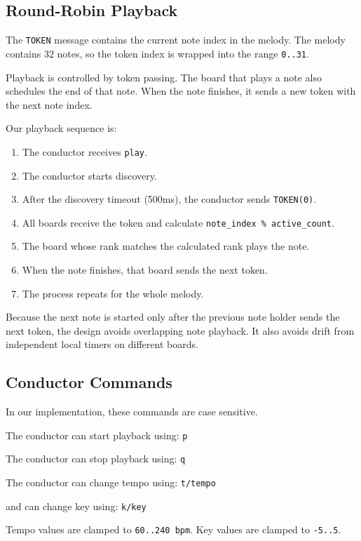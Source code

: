 \documentclass[11pt,a4paper]{article}
\begin{document}
\subsection*{Round-Robin Playback}

The \texttt{TOKEN} message contains the current note index in the melody. The melody contains 32 notes, so the token index is wrapped into the range \texttt{0..31}.

Playback is controlled by token passing. The board that plays a note also schedules the end of that note. When the note finishes, it sends a new token with the next note index.

Our playback sequence is:

\begin{enumerate}
  \item The conductor receives \texttt{play}.
  \item The conductor starts discovery.
  \item After the discovery timeout (500ms), the conductor sends \texttt{TOKEN(0)}.
  \item All boards receive the token and calculate \texttt{note\_\allowbreak{}index \% active\_\allowbreak{}count}.
  \item The board whose rank matches the calculated rank plays the note.
  \item When the note finishes, that board sends the next token.
  \item The process repeats for the whole melody.
\end{enumerate}

Because the next note is started only after the previous note holder sends the next token, the design avoids overlapping note playback. It also avoids drift from independent local timers on different boards.

\subsection*{Conductor Commands}

In our implementation, these commands are case sensitive.

The conductor can start playback using: \texttt{p}

The conductor can stop playback using: \texttt{q}

The conductor can change tempo using: \texttt{t/tempo}

and can change key using: \texttt{k/key}

Tempo values are clamped to \texttt{60..240 bpm}. Key values are clamped to \texttt{-5..5}.
\end{document}
